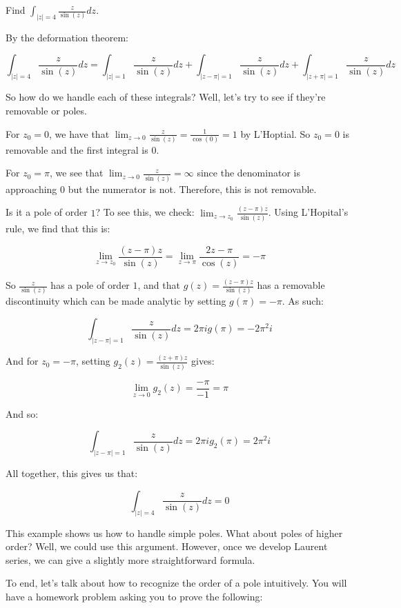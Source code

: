 \begin{ex}{}{} Find $\int_{|z| = 4} \frac{z}{\sin(z)}dz$.

By the deformation theorem:

$$\int_{|z| = 4}\frac{z}{\sin(z)}dz = \int_{|z| = 1} \frac{z}{\sin(z)}dz + \int_{|z-\pi| = 1} \frac{z}{\sin(z)}dz + \int_{|z+\pi| = 1}\frac{z}{\sin(z)}dz$$

So how do we handle each of these integrals? Well, let's try to see if they're removable or poles.

For $z_0 = 0$, we have that $\lim_{z\rightarrow 0} \frac{z}{\sin(z)} = \frac{1}{\cos(0)} = 1$ by L'Hoptial. So $z_0 = 0$ is removable and the first integral is $0$.

For $z_0 = \pi$, we see that $\lim_{z\rightarrow 0} \frac{z}{\sin(z)} = \infty$ since the denominator is approaching $0$ but the numerator is not. Therefore, this is not removable.

Is it a pole of order $1$? To see this, we check: $\lim_{z\rightarrow z_0} \frac{(z-\pi)z}{\sin(z)}$. Using L'Hopital's rule, we find that this is:


$$\lim_{z\rightarrow z_0} \frac{(z-\pi)z}{\sin(z)} = \lim_{z\rightarrow \pi} \frac{2z - \pi}{\cos(z)} = -\pi$$

So $\frac{z}{\sin(z)}$ has a pole of order $1$, and that $g(z) = \frac{(z-\pi)z}{\sin(z)}$ has a removable discontinuity which can be made analytic by setting $g(\pi) = -\pi$. As such:

$$\int_{|z-\pi| = 1} \frac{z}{\sin(z)}dz = 2\pi ig(\pi) = -2\pi^2 i$$

And for $z_0 = -\pi$, setting $g_2(z) = \frac{(z + \pi)z}{\sin(z)}$ gives:

$$\lim_{z\rightarrow 0} g_2(z) = \frac{-\pi}{-1} = \pi$$

And so:

$$\int_{|z-\pi| = 1} \frac{z}{\sin(z)}dz = 2\pi ig_2(\pi) = 2\pi^2 i$$

All together, this gives us that:

$$\int_{|z| = 4}\frac{z}{\sin(z)}dz =0$$
\end{ex}

This example shows us how to handle simple poles. What about poles of higher order? Well, we could use this argument. However, once we develop Laurent series, we can give a slightly more straightforward formula.

To end, let's talk about how to recognize the order of a pole intuitively. You will have a homework problem asking you to prove the following:

